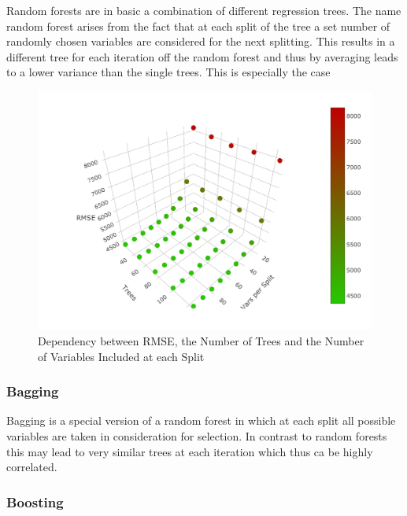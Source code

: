 \documentclass[11pt,]{article}
\begin{document}
Random forests are in basic a combination of different regression trees.
The name random forest arises from the fact that at each split of the
tree a set number of randomly chosen variables are considered for the
next splitting. This results in a different tree for each iteration off
the random forest and thus by averaging leads to a lower variance than
the single trees. This is especially the case

\begin{figure}

{\centering \includegraphics{../00_data/output_paper/10_rf_plot} 

}

\caption[RMSE's of the Random Forest for Different Parameters]{Dependency between RMSE, the Number of Trees and the Number of Variables Included at each Split}\label{fig:unnamed-chunk-11}
\end{figure}

\hypertarget{bagging}{%
\subsubsection{Bagging}\label{bagging}}

Bagging is a special version of a random forest in which at each split
all possible variables are taken in consideration for selection. In
contrast to random forests this may lead to very similar trees at each
iteration which thus ca be highly correlated.

\hypertarget{boosting}{%
\subsubsection{Boosting}\label{boosting}}
\end{document}
